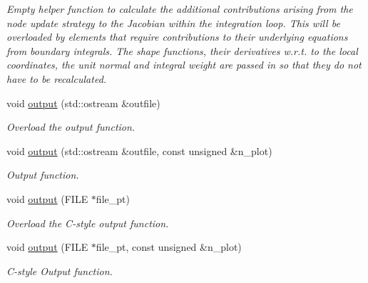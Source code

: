 \begin{DoxyCompactItemize}
\begin{DoxyCompactList}\small\item\em Empty helper function to calculate the additional contributions arising from the node update strategy to the Jacobian within the integration loop. This will be overloaded by elements that require contributions to their underlying equations from boundary integrals. The shape functions, their derivatives w.\+r.\+t. to the local coordinates, the unit normal and integral weight are passed in so that they do not have to be recalculated. \end{DoxyCompactList}\item 
void \hyperlink{classoomph_1_1FluidInterfaceBoundingElement_a81adc5ae89ddfa120f587c61b972622f}{output} (std\+::ostream \&outfile)
\begin{DoxyCompactList}\small\item\em Overload the output function. \end{DoxyCompactList}\item 
void \hyperlink{classoomph_1_1FluidInterfaceBoundingElement_af2c821d51d506221976a0c17e1615ac3}{output} (std\+::ostream \&outfile, const unsigned \&n\+\_\+plot)
\begin{DoxyCompactList}\small\item\em Output function. \end{DoxyCompactList}\item 
void \hyperlink{classoomph_1_1FluidInterfaceBoundingElement_a85cc62405429744e3e3585894315cb9e}{output} (F\+I\+LE $\ast$file\+\_\+pt)
\begin{DoxyCompactList}\small\item\em Overload the C-\/style output function. \end{DoxyCompactList}\item 
void \hyperlink{classoomph_1_1FluidInterfaceBoundingElement_ae85ea987a06275a03ad6d0e3710871da}{output} (F\+I\+LE $\ast$file\+\_\+pt, const unsigned \&n\+\_\+plot)
\begin{DoxyCompactList}\small\item\em C-\/style Output function. \end{DoxyCompactList}\end{DoxyCompactItemize}
